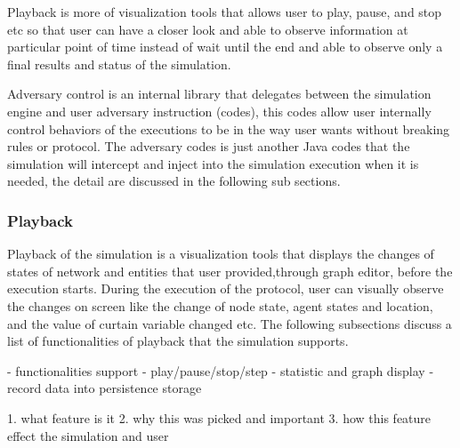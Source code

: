 \begin{description}
\begin{description}
\begin{description}
Playback is more of visualization tools that allows user to play, pause, and stop etc so that user can have a closer look and able to observe information at particular point of time instead of wait until the end and able to observe only a final results and status of the simulation.

Adversary control is an internal library that delegates between the simulation engine and user adversary instruction (codes), this codes allow user internally control behaviors of the executions to be in the way user wants without breaking rules or protocol. The adversary codes is just another Java codes that the simulation will intercept and inject into the simulation execution when it is needed, the detail are discussed in the following sub sections.


\subsubsection{Playback}

Playback of the simulation is a visualization tools that displays the changes of states of network and entities that user provided,through graph editor, before the execution starts. During the execution of the protocol, user can visually observe the changes on screen like the change of node state, agent states and location, and the value of curtain variable changed etc. The following subsections discuss a list of functionalities of playback that the simulation supports.

- functionalities support
	- play/pause/stop/step
	- statistic and graph display
	- record data into persistence storage

1. what feature is it
2. why this was picked and important
3. how this feature effect the simulation and user

\end{description}
\end{description}
\end{description}
